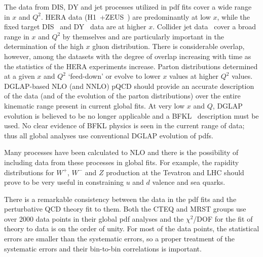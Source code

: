\documentclass[12pt]{iopart}
\begin{document}
The data from DIS, DY and jet processes utilized in pdf fits cover a wide range in $x$ and $Q^2$. HERA data
(H1~\cite{H1}+ZEUS~\cite{ZEUS}) are predominantly at low $x$, while the fixed target DIS~\cite{CCFR2,BCDMSp,BCDMSd,NMC,CCFR3} and
DY~\cite{E605,E866} data are at higher $x$. Collider jet data~\cite{CDFjet,D0jet} cover a broad range in $x$ and $Q^2$ by themselves and
are particularly important in the determination of the high $x$ gluon distribution. There is considerable  overlap, however, among the
datasets with the degree of overlap increasing with time as the statistics of the HERA experiments increase. Parton distributions
determined at a given $x$ and $Q^2$ `feed-down' or evolve to lower $x$ values at higher $Q^2$ values.  DGLAP-based NLO (and NNLO) pQCD
should  provide an accurate description of the data (and of the evolution of the parton distributions) over the entire kinematic  range
present in current global fits. At very low $x$ and $Q$, DGLAP evolution is believed to be no longer 
applicable and a BFKL~\cite{Fadin:1975cb,Kuraev:1976ge,Kuraev:1977fs,Balitsky:1978ic} description 
must be used.  No clear evidence of BFKL physics is seen in the current range of data;  thus all global analyses use
conventional DGLAP evolution of pdfs.

Many processes have been calculated to NLO and there is the possibility of including data from these processes in global fits.
For example, the rapidity distributions for $W^+$,  $W^-$ and $Z$ production at the Tevatron and  LHC should prove to be very
useful in constraining $u$ and $d$ valence and sea quarks. 

There is a remarkable consistency between the data in the pdf fits and the perturbative QCD theory fit to them. Both the CTEQ and
MRST groups use over 2000 data points in  their global pdf analyses  and the $\chi^2$/DOF for the fit of theory to data is on the
order of unity. For most of the data points, the statistical errors are smaller than the systematic errors, so a proper treatment
of the systematic errors and their bin-to-bin correlations is important. 
\end{document}
